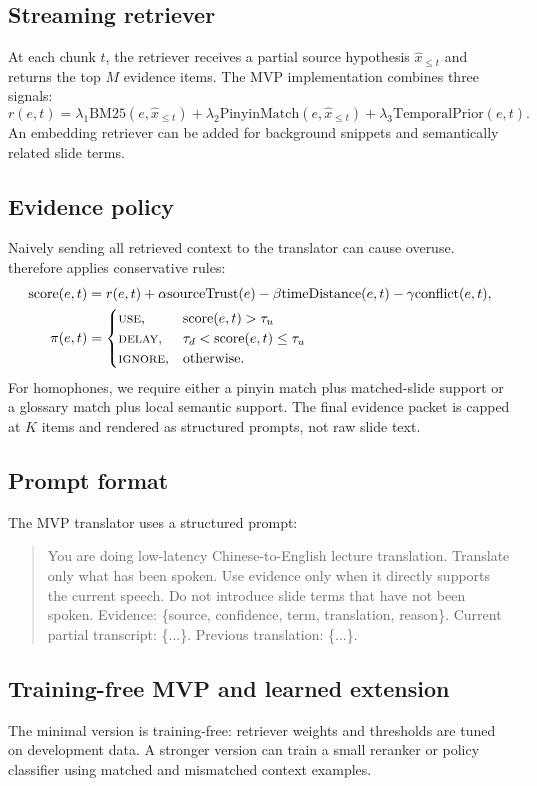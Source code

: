 \subsection{Streaming retriever}

At each chunk $t$, the retriever receives a partial source hypothesis $\hat{x}_{\leq t}$ and returns the top $M$ evidence items.  The MVP implementation combines three signals:
\begin{equation}
    r(e,t) = \lambda_1 \mathrm{BM25}(e, \hat{x}_{\leq t}) + \lambda_2 \mathrm{PinyinMatch}(e, \hat{x}_{\leq t}) + \lambda_3 \mathrm{TemporalPrior}(e,t).
\end{equation}
An embedding retriever can be added for background snippets and semantically related slide terms.

\subsection{Evidence policy}

Naively sending all retrieved context to the translator can cause overuse.  \policyname{} therefore applies conservative rules:
\begin{align}
    \mathrm{score}(e,t) &= r(e,t) + \alpha \mathrm{sourceTrust}(e) - \beta \mathrm{timeDistance}(e,t) - \gamma \mathrm{conflict}(e,t), \\
    \pi(e,t) &=
    \begin{cases}
    \textsc{use}, & \mathrm{score}(e,t) > \tau_u \\
    \textsc{delay}, & \tau_d < \mathrm{score}(e,t) \leq \tau_u \\
    \textsc{ignore}, & \mathrm{otherwise.}
    \end{cases}
\end{align}
For homophones, we require either a pinyin match plus matched-slide support or a glossary match plus local semantic support.  The final evidence packet is capped at $K$ items and rendered as structured prompts, not raw slide text.

\subsection{Prompt format}

The MVP translator uses a structured prompt:
\begin{quote}\small
You are doing low-latency Chinese-to-English lecture translation. Translate only what has been spoken. Use evidence only when it directly supports the current speech. Do not introduce slide terms that have not been spoken. Evidence: \{source, confidence, term, translation, reason\}. Current partial transcript: \{...\}. Previous translation: \{...\}.
\end{quote}

\subsection{Training-free MVP and learned extension}

The minimal version is training-free: retriever weights and thresholds are tuned on development data.  A stronger version can train a small reranker or policy classifier using matched and mismatched context examples.
